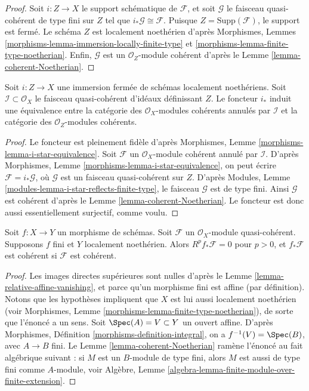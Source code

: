 \begin{proof}
Soit $i : Z \to X$ le support schématique de $\mathcal{F}$, et
soit $\mathcal{G}$ le faisceau quasi-cohérent de type fini sur $Z$
tel que $i_*\mathcal{G} \cong \mathcal{F}$.
Puisque $Z = \text{Supp}(\mathcal{F})$, le support est fermé.
Le schéma $Z$ est localement noethérien d'après
Morphismes, Lemmes \ref{morphisms-lemma-immersion-locally-finite-type}
et \ref{morphisms-lemma-finite-type-noetherian}.
Enfin, $\mathcal{G}$ est un $\mathcal{O}_Z$-module cohérent d'après le
Lemme \ref{lemma-coherent-Noetherian}.
\end{proof}

\begin{lemma}
\label{lemma-i-star-equivalence}
Soit $i : Z \to X$ une immersion fermée de schémas localement noethériens.
Soit $\mathcal{I} \subset \mathcal{O}_X$ le faisceau quasi-cohérent d'idéaux
définissant $Z$. Le foncteur $i_*$ induit une équivalence entre la
catégorie des $\mathcal{O}_X$-modules cohérents annulés par $\mathcal{I}$
et la catégorie des $\mathcal{O}_Z$-modules cohérents.
\end{lemma}

\begin{proof}
Le foncteur est pleinement fidèle d'après
Morphismes, Lemme \ref{morphisms-lemma-i-star-equivalence}.
Soit $\mathcal{F}$ un $\mathcal{O}_X$-module cohérent
annulé par $\mathcal{I}$. D'après
Morphismes, Lemme \ref{morphisms-lemma-i-star-equivalence},
on peut écrire $\mathcal{F} = i_*\mathcal{G}$, où
$\mathcal{G}$ est un faisceau quasi-cohérent sur $Z$. D'après
Modules, Lemme \ref{modules-lemma-i-star-reflects-finite-type},
le faisceau $\mathcal{G}$ est de type fini.
Ainsi $\mathcal{G}$ est cohérent d'après le
Lemme \ref{lemma-coherent-Noetherian}.
Le foncteur est donc aussi essentiellement surjectif, comme voulu.
\end{proof}

\begin{lemma}
\label{lemma-finite-pushforward-coherent}
Soit $f : X \to Y$ un morphisme de schémas.
Soit $\mathcal{F}$ un $\mathcal{O}_X$-module quasi-cohérent.
Supposons $f$ fini et $Y$ localement noethérien.
Alors $R^pf_*\mathcal{F} = 0$ pour $p > 0$, et
$f_*\mathcal{F}$ est cohérent si $\mathcal{F}$ est cohérent.
\end{lemma}

\begin{proof}
Les images directes supérieures sont nulles d'après le
Lemme \ref{lemma-relative-affine-vanishing}, et parce
qu'un morphisme fini est affine (par définition).
Notons que les hypothèses impliquent que $X$ est lui aussi localement noethérien
(voir Morphismes, Lemme \ref{morphisms-lemma-finite-type-noetherian}),
de sorte que l'énoncé a un sens.
Soit $\Spec(A) = V \subset Y$ un ouvert affine.
D'après Morphismes, Définition \ref{morphisms-definition-integral},
on a $f^{-1}(V) = \Spec(B)$, avec $A \to B$ fini.
Le Lemme \ref{lemma-coherent-Noetherian}
ramène l'énoncé au fait algébrique
suivant : si $M$ est un $B$-module de type fini, alors $M$ est aussi de type fini
comme $A$-module, voir
Algèbre, Lemme \ref{algebra-lemma-finite-module-over-finite-extension}.
\end{proof}

